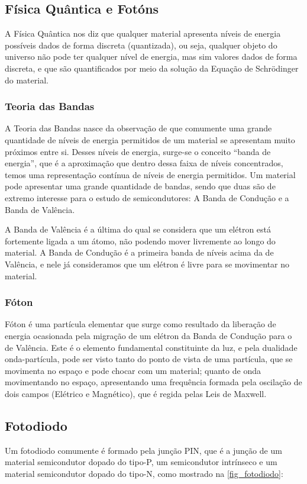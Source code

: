 \subsection{Física Quântica e Fotóns}
A Física Quântica nos diz que qualquer material apresenta níveis de energia possíveis dados de forma discreta (quantizada), ou seja, qualquer objeto do universo não pode ter qualquer nível de energia, mas sim valores dados de forma discreta, e que são quantificados por meio da solução da Equação de Schrödinger do material. \cite{Sze, JohnSingleton}

\subsubsection{Teoria das Bandas}

A Teoria das Bandas nasce da observação de que comumente uma grande quantidade de níveis de energia permitidos de um material se apresentam muito próximos entre si. Desses níveis de energia, surge-se o conceito “banda de energia”, que \'e a aproximação que dentro dessa faixa de níveis concentrados, temos uma representação contínua de níveis de energia permitidos. Um material pode apresentar uma grande quantidade de bandas, sendo que duas são de extremo interesse para o estudo de semicondutores: A Banda de Condução e a Banda de Valência.

A Banda de Valência \'e a última do qual se considera que um el\'etron está fortemente ligada a um átomo, não podendo mover livremente ao longo do material. A Banda de Condução \'e a primeira banda de níveis acima da de Valência, e nele já consideramos que um el\'etron \'e livre para se movimentar no material.

\subsubsection{Fóton}

Fóton \'e uma partícula elementar que surge como resultado da liberação de energia ocasionada pela migração de um el\'etron da Banda de Condução para o de Valência. Este \'e o elemento fundamental constituinte da luz, e pela dualidade onda-partícula, pode ser visto tanto do ponto de vista de uma partícula, que se movimenta no espaço e pode chocar com um material; quanto de onda movimentando no espaço, apresentando uma frequência formada pela oscilação de dois campos (El\'etrico e Magn\'etico), que \'e regida pelas Leis de Maxwell.

\subsection{Fotodiodo}
\label{secao_fotodiodo}
Um fotodiodo comumente \'e formado pela junção PIN, que \'e a junção de um material semicondutor dopado do tipo-P, um semicondutor intrínseco e um material semicondutor dopado do tipo-N, como mostrado na \autoref{fig_fotodiodo}:

